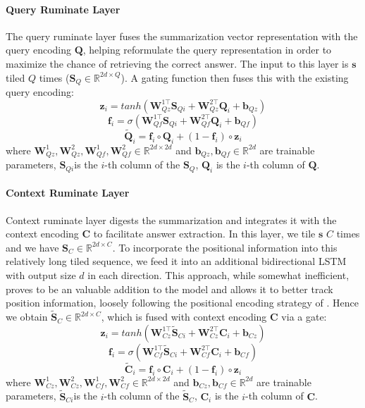 \documentclass[11pt,letterpaper]{article}
\begin{document}
\paragraph{Query Ruminate Layer} The query ruminate layer fuses the summarization vector representation with the query encoding $\bm{Q}$, helping reformulate the query representation in order to maximize the chance of retrieving the correct answer. The input to this layer is $\bm{s}$ tiled $Q$ times ($\bm{S}_Q\in \mathbb{R}^{2d\times Q}$). A gating function then fuses this with the existing query encoding:
\begin{equation}
\bm{z}_i = tanh(\bm{W}^{1\top}_{Qz} \bm{S}_{Qi} + \bm{W}^{2\top}_{Qz}\bm{Q}_i + \bm{b}_{Qz})
\end{equation}
\begin{equation}
\bm{f}_i = \sigma(\bm{W}^{1\top}_{Qf} \bm{S}_{Qi} + \bm{W}^{2\top}_{Qf}\bm{Q}_i + \bm{b}_{Qf})
\end{equation}
\begin{equation}
\tilde{\bm{Q}}_i = \bm{f}_i \circ \bm{Q}_i + (1-\bm{f}_i)\circ \bm{z}_i
\end{equation}
where $\bm{W}^1_{Qz} , \bm{W}^2_{Qz}, \bm{W}^1_{Qf}, \bm{W}^2_{Qf} \in \mathbb{R}^{2d\times 2d}$ and $\bm{b}_{Qz}, \bm{b}_{Qf} \in \mathbb{R}^{2d}$ are trainable parameters, $\bm{S}_{Qi} $is the $i$-th column of the $\bm{S}_Q$, $\bm{Q}_i$ is the $i$-th column of $\bm{Q}$.

\paragraph{Context Ruminate Layer} Context ruminate layer digests the summarization and integrates it with the context encoding $\bm{C}$ to facilitate answer extraction. In this layer, we tile $\bm{s}$ $C$ times and we have $\bm{S}_C\in \mathbb{R}^{2d\times C}$. To incorporate the positional information into this relatively long tiled sequence, we feed it into an additional bidirectional LSTM with output size $d$  in each direction. This approach, while somewhat inefficient, proves to be an valuable addition to the model and allows it to better track position information, loosely following the positional encoding strategy of \citet{memN2N_Sukhbaatar:2015ww}. Hence we obtain $\bm{\tilde{S}}_C \in \mathbb{R}^{2d \times C}$, which is fused with context encoding $\bm{C}$ via a gate:
\begin{equation}
\bm{z}_i = tanh(\bm{W}^{1\top}_{Cz} \tilde{\bm{S}}_{Ci} + \bm{W}^{2\top}_{Cz}\bm{C}_i + \bm{b}_{Cz})
\end{equation}
\begin{equation}
\bm{f}_i = \sigma(\bm{W}^{1\top}_{Cf}\tilde{\bm{S}}_{Ci} + \bm{W}^{2\top}_{Cf}\bm{C}_i + \bm{b}_{Cf} ) 
\end{equation}
\begin{equation}
\tilde{\bm{C}}_i = \bm{f}_i \circ \bm{C}_i + (1-\bm{f}_i) \circ \bm{z}_i
\end{equation}
where $\bm{W}^1_{Cz} , \bm{W}^2_{Cz}, \bm{W}^1_{Cf}, \bm{W}^2_{Cf} \in \mathbb{R}^{2d\times 2d}$ and $\bm{b}_{Cz}, \bm{b}_{Cf} \in \mathbb{R}^{2d}$ are trainable parameters, $\tilde{\bm{S}}_{Ci} $is the $i$-th column of the $\tilde{\bm{S}}_C$, $\bm{C}_i$ is the $i$-th column of $\bm{C}$.
\end{document}

